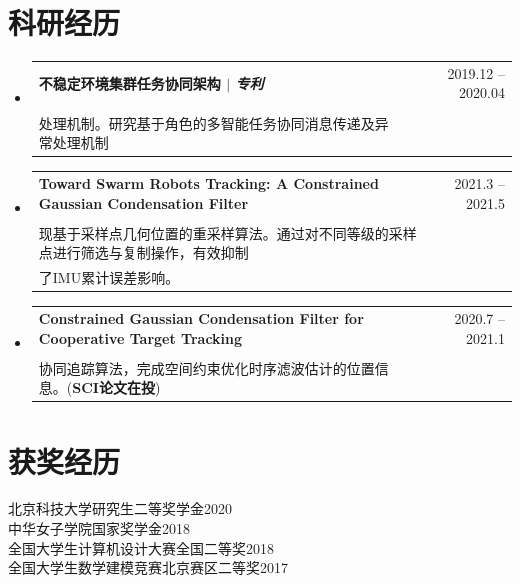 \documentclass[a4paper,11pt]{ctexart}
\makeatletter
\newcommand{\CVItem}[1]{
	\item\small{
		{#1 \vspace{-2pt}}
	}
}
\newcommand{\CVSubheading}[4]{
	\vspace{-2pt}\item
	\begin{tabular*}{0.97\textwidth}[t]{l@{\extracolsep{\fill}}r}
		\textbf{#1} & #2 \\
		\small#3 & \small #4 \\
	\end{tabular*}\vspace{-7pt}
}
\newcommand{\CVSubHeadingListStart}{\begin{itemize}[leftmargin=0.5cm, label={}]}
\newcommand{\CVSubHeadingListEnd}{\end{itemize}}
\newcommand{\CVItemListStart}{\begin{itemize}}
\newcommand{\CVItemListEnd}{\end{itemize}\vspace{-5pt}}
\makeatother
\begin{document}
	\section{科研经历}
	\CVSubHeadingListStart
	\CVSubheading
	{不稳定环境集群任务协同架构 $|$ \emph{\small{专利}}}{2019.12 -- 2020.04}
	{\makecell[l]{\hspace{2em}构建基于角色的多智能体协同模型体系，建立多智能体间通用的分布式自适应的协同任务\\
		处理机制。研究基于角色的多智能任务协同消息传递及异常处理机制}}{}
	\CVSubheading
	{\small\textbf{Toward Swarm Robots Tracking: A Constrained Gaussian Condensation Filter}}{2021.3 -- 2021.5}
	{\makecell[l]{\hspace{2em}针对目标追踪存在的累计误差问题，根据IMU预估中心以及置信规模，建立误差椭圆，实\\
	现基于采样点几何位置的重采样算法。通过对不同等级的采样点进行筛选与复制操作，有效抑制\\
	了IMU累计误差影响。}}{}
	\CVSubheading
	{\small\textbf{Constrained Gaussian Condensation Filter for Cooperative Target Tracking} }{2020.7 -- 2021.1}
	{\makecell[l]{\hspace{2em}基于时空约束高斯聚合滤波的协同运动追踪，提出一种基于时空约束高斯聚合滤波的多目标\\
			协同追踪算法，完成空间约束优化时序滤波估计的位置信息。(\textbf{SCI论文在投})}}{}
	\CVSubHeadingListEnd
	
	

	
	\section{获奖经历}
	{北京科技大学研究生二等奖学金}\hfill{2020}\\
	{中华女子学院国家奖学金}\hfill{2018} \\
	{全国大学生计算机设计大赛全国二等奖}\hfill{2018} \\
	{全国大学生数学建模竞赛北京赛区二等奖}\hfill{2017}\\

	

	
\end{document}
